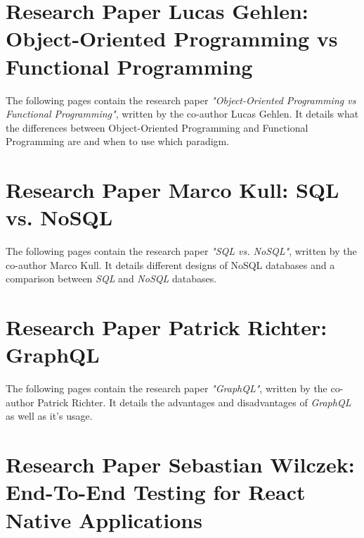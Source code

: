 \patchcmd{\appendices}{\quad}{: }{}{}
\begin{appendices}

\section{Research Paper Lucas Gehlen: Object-Oriented Programming vs Functional Programming}
\label{appendix:research_paper_lucas_gehlen}

The following pages contain the research paper \textit{"Object-Oriented Programming vs Functional Programming"}, written by the co-author Lucas Gehlen. It details what the differences between Object-Oriented Programming and Functional Programming are and when to use which paradigm. 

 

\newpage

\section{Research Paper Marco Kull: SQL vs. NoSQL}
\label{appendix:research_paper_marco_kull}

The following pages contain the research paper \textit{"SQL vs. NoSQL"}, written by the co-author Marco Kull. It details different designs of NoSQL databases and a comparison between \textit{SQL} and \textit{NoSQL} databases.

 

\newpage

\section{Research Paper Patrick Richter: GraphQL}
\label{appendix:research_paper_patrick_richter}

The following pages contain the research paper \textit{"GraphQL"}, written by the co-author Patrick Richter. It details the advantages and disadvantages of \textit{GraphQL} as well as it's usage.

 

\newpage

\section{Research Paper Sebastian Wilczek: End-To-End Testing for React Native Applications}
\label{appendix:research_paper_sebastian_wilczek}


\end{appendices}
